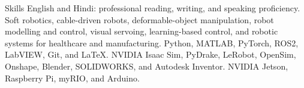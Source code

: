 
\begin{rubric}{Skills}
\entry*[Languages]
	English and Hindi: professional reading, writing, and speaking proficiency.
	Soft robotics, cable-driven robots, deformable-object manipulation, robot modelling and control, visual servoing, learning-based control, and robotic systems for healthcare and manufacturing.
\entry*[Programming]
	Python, MATLAB, PyTorch, ROS2, LabVIEW, Git, and LaTeX.
	NVIDIA Isaac Sim, PyDrake, LeRobot, OpenSim, Onshape, Blender, SOLIDWORKS, and Autodesk Inventor.
\entry*[Hardware]
	NVIDIA Jetson, Raspberry Pi, myRIO, and Arduino.
\end{rubric}
